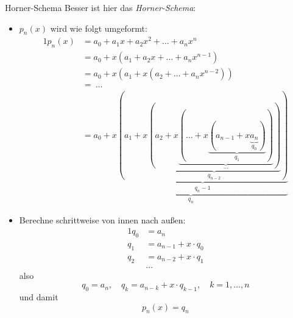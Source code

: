 \begin{defi}{Horner-Schema}
    Besser ist hier das \emph{Horner-Schema}: 
    \begin{itemize}
        \item $p_n(x)$ wird wie folgt umgeformt:
              \begin{alignat*}{1}
                  p_n (x) & = a_0 + a_1 x + a_2 x^2 + \ldots + a_n x^n                                                                                                                                                      \\ 
                          & = a_0 + x \left( a_1 + a_2 x + \ldots + a_n x^{n-1} \right)                                                                                                                                     \\ 
                          & = a_0 + x \left( a_1 + x \left( a_2 + \ldots + a_n x^{n-2} \right) \right)                                                                                                                      \\ 
                          & = \ \ldots                                                                                                                                                                                      \\ 
                          & = \underbrace{a_0 + x \underbrace{( a_1 + x \underbrace{( a_2 + x \underbrace{( \ldots + x \underbrace{( a_{n-1} + x \underbrace{a_n}_{q_0} )}_{q_1} )}_{\ldots} )}_{q_{n-2}} )}_{q_n-1}}_{q_n}
              \end{alignat*}
        \item Berechne schrittweise von innen nach außen:
              \begin{alignat*}{1}
                  q_0 & = a_n                   \\ 
                  q_1 & = a_{n-1} + x \cdot q_0 \\
                  q_2 & = a_{n-2} + x \cdot q_1 \\
                      & \ldots
              \end{alignat*}
              also
              \[ 
                  q_0 = a_n, \quad q_k = a_{n-k} + x \cdot q_{k-1}, \quad k = 1, \ldots, n
              \]
              und damit 
              \[ 
                  p_n(x) = q_n
              \]
    \end{itemize}
\end{defi}

